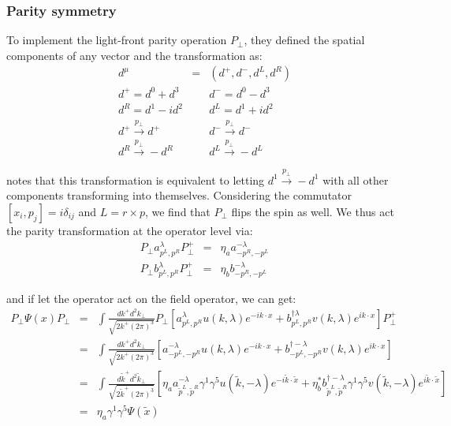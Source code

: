 \documentclass[a4paper,12pt]{article}
\begin{document}
\subsubsection{Parity symmetry}

To implement the light-front parity operation $P_{\perp}$, they defined the spatial components of any vector and the transformation as:
\begin{eqnarray}
d^{\mu} &=& (d^+,d^-,d^L,d^R)\nonumber\\
d^+ = d^0 + d^3
&& d^- = d^0 - d^3\nonumber\\
d^R = d^1 - i d^2
&& d^L = d^1 + i d^2\nonumber\\
d^+ \xrightarrow{p_{\perp}} d^+
&& d^- \xrightarrow{p_{\perp}} d^- \nonumber\\
d^R \xrightarrow{p_{\perp}} -d^R
&& d^L \xrightarrow{p_{\perp}} -d^L\nonumber\
\end{eqnarray}

notes that this transformation is equivalent to letting $d^1 \xrightarrow{p_{\perp}} -d^1$ with all other components transforming into themselves. Considering the commutator $[x_i , p_j] = i\delta_{ij}$ and $L=r \times p$, we find that $P_{\perp}$ flips the spin as well.
We thus act the parity transformation at the operator level via:
\begin{eqnarray}
P_{\perp} a^{\lambda}_{p^L,p^R} P^+_{\perp} &=& \eta_a a^{-\lambda}_{-p^R,-p^L} \nonumber\\
P_{\perp} b^{\lambda}_{p^L,p^R} P^+_{\perp} &=& \eta_b b^{-\lambda}_{-p^R,-p^L} \
\end{eqnarray}

and if let the operator act on the field operator, we can get:
\begin{eqnarray}
P_{\perp} \Psi(x) P_{\perp} &=& \int \frac{dk^+d^2 k_{\perp}}{\sqrt{2k^+(2\pi)^3}}P_{\perp}[a^{\lambda}_{p^L,p^R}u(k,\lambda)e^{-ik\cdot x} +
b^{\dag\lambda}_{p^L,p^R}v(k,\lambda)e^{ik\cdot x}]P^+_{\perp}\nonumber\\
&=& \int \frac{dk^+d^2 k_{\perp}}{\sqrt{2k^+(2\pi)^3}}[a^{-\lambda}_{-p^L,-p^R}u(k,\lambda)e^{-ik\cdot x} +b^{\dag-\lambda}_{-p^L,-p^R}v(k,\lambda)e^{ik\cdot x}]\nonumber\\
&=& \int \frac{d\tilde{k}^+d^2 \tilde{k}_{\perp}}{\sqrt{2\tilde{k}^+(2\pi)^3}}[\eta_aa^{-\lambda}_{\tilde{p}^L,\tilde{p}^R}\gamma^1\gamma^5u(\tilde{k},-\lambda)e^{-i\tilde{k}\cdot \tilde{x}} +\eta^{\ast}_bb^{\dag-\lambda}_{\tilde{p}^L,\tilde{p}^R}\gamma^1\gamma^5v(\tilde{k},-\lambda)e^{i\tilde{k}\cdot \tilde{x}}]\nonumber\\
&=& \eta_a \gamma^1\gamma^5 \Psi(\tilde{x})\
\end{eqnarray}
\end{document}
